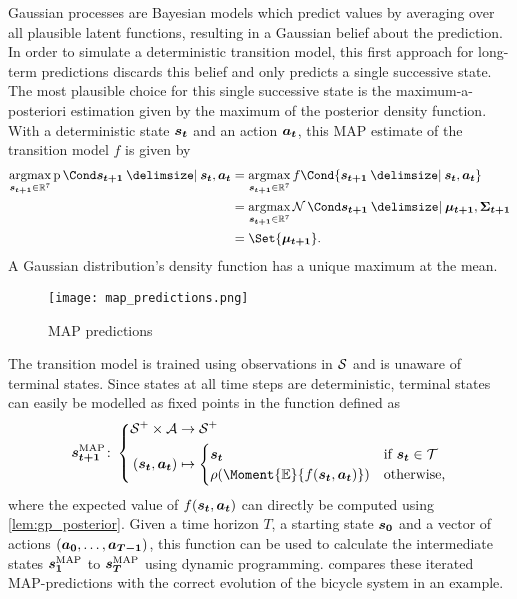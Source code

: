 Gaussian processes are Bayesian models which predict values by averaging over all plausible latent functions, resulting in a Gaussian belief about the prediction.
In order to simulate a deterministic transition model, this first approach for long-term predictions discards this belief and only predicts a single successive state.
The most plausible choice for this single successive state is the maximum-a-posteriori estimation given by the maximum of the posterior density function.
With a deterministic state $\bm{s_t}$ and an action $\bm{a_t}$, this MAP estimate of the transition model $f$ is given by
\begin{align}
    \argmax_{\mat{s_{t+1}} \in \R^7} \Prob{\mat{s_{t+1}} \given \mat{s_t}, \mat{a_t}} &= \argmax_{\mat{s_{t+1}} \in \R^7} f\Cond{\mat{s_{t+1}} \given \mat{s_t}, \mat{a_t}} \\
    &= \argmax_{\mat{s_{t+1}} \in \R^7} \Gaussian{\mat{s_{t+1}} \given \mat{\mu_{t+1}}, \mat{\Sigma_{t+1}}} \\
    &= \Set{\mat{\mu_{t+1}}}.
\end{align}
A Gaussian distribution's density function has a unique maximum at the mean.

\begin{figure}[t]
    \centering
    \texttt{[image: map\_predictions.png]}
    \caption{MAP predictions}
    \label{fig:map_predictions}
\end{figure}
The transition model is trained using observations in $\mathcal{S}$ and is unaware of terminal states.
Since states at all time steps are deterministic, terminal states can easily be modelled as fixed points in the function defined as
\begin{align}
    \map{\mat{s_{t+1}}} \colon \left\{
        \begin{aligned}
            \Es^+ \times \Ah &\to \Es^+ \\
            (\mat{s_t}, \mat{a_t}) &\mapsto \begin{cases}
            \mat{s_t} & \text{if $\mat{s_t} \in \Tee$} \\
            \squeeze(\Moment{\E}{f(\mat{s_t}, \mat{a_t})}) & \text{otherwise,}
        \end{cases}
    \end{aligned}
    \right.
\end{align}
where the expected value of $f(\bm{s_t}, \bm{a_t})$ can directly be computed using \cref{lem:gp_posterior}.
Given a time horizon $T$, a starting state $\bm{s_0}$ and a vector of actions $(\bm{a_0}, \dots, \bm{a_{T-1}})$, this function can be used to calculate the intermediate states $\bm{s_1}^{\text{MAP}}$ to $\bm{s_T}^{\text{MAP}}$ using dynamic programming.
 compares these iterated MAP-predictions with the correct evolution of the bicycle system in an example.

